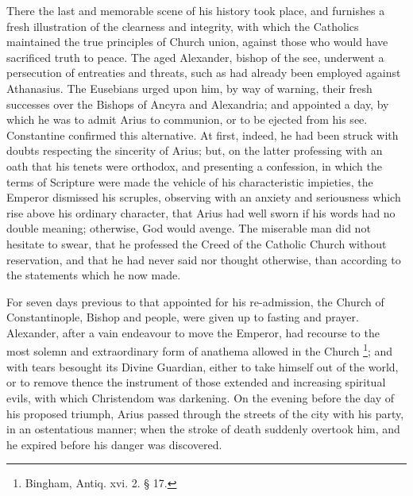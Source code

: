 There the last and memorable scene of his history took place, and
furnishes a fresh illustration of the clearness and integrity, with
which the Catholics maintained the true principles of Church union,
against those who would have sacrificed truth to peace. The aged
Alexander, bishop of the see, underwent a persecution of entreaties
and threats, such as had already been employed against Athanasius. The
Eusebians urged upon him, by way of warning, their fresh successes
over the Bishops of Ancyra and Alexandria; and appointed a day, by
which he was to admit Arius to communion, or to be ejected from his
see. Constantine confirmed this alternative. At first, indeed, he had
been struck with doubts respecting the sincerity of Arius; but, on the
latter professing with an oath that his tenets were orthodox, and
presenting a confession, in which the terms of Scripture were made the
vehicle of his characteristic impieties, the Emperor dismissed his
scruples, observing with an anxiety and seriousness which rise above
his ordinary character, that Arius had well sworn if his words had no
double meaning; otherwise, God would avenge. The miserable man did not
hesitate to swear, that he professed the Creed of the Catholic Church
without reservation, and that he had never said nor thought otherwise,
than according to the statements which he now made.

For seven days previous to that appointed for his re-admission, the
Church of Constantinople, Bishop and people, were given up to
fasting and prayer. Alexander, after a vain endeavour to move the
Emperor, had recourse to the most solemn and extraordinary form of
anathema allowed in the Church \footnote{Bingham, Antiq. xvi. 2. § 17.}; and with tears besought its Divine Guardian, either to take
himself out of the world, or to remove thence the instrument of those
extended and increasing spiritual evils, with which Christendom was
darkening. On the evening before the day of his proposed triumph,
Arius passed through the streets of the city with his party, in an
ostentatious manner; when the stroke of death suddenly overtook him,
and he expired before his danger was discovered.

